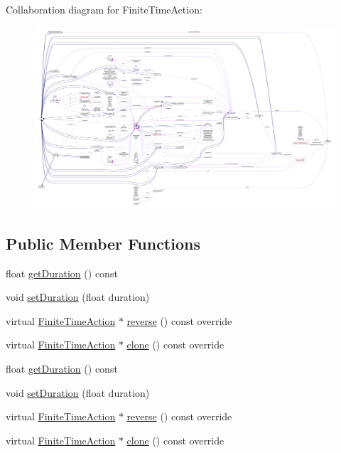 Collaboration diagram for Finite\+Time\+Action\+:
\nopagebreak
\begin{figure}[H]
\begin{center}
\leavevmode
\includegraphics[width=350pt]{classFiniteTimeAction__coll__graph}
\end{center}
\end{figure}
\subsection*{Public Member Functions}
\begin{DoxyCompactItemize}
\item 
float \hyperlink{classFiniteTimeAction_aaa74e388b42ead7cfb7ed9013f6f9aea}{get\+Duration} () const
\item 
void \hyperlink{classFiniteTimeAction_a58c2f166e94dd5b39f8a4b566adf1281}{set\+Duration} (float duration)
\item 
virtual \hyperlink{classFiniteTimeAction}{Finite\+Time\+Action} $\ast$ \hyperlink{classFiniteTimeAction_a886bbdd2dc82167fe6ffae664c22dacc}{reverse} () const override
\item 
virtual \hyperlink{classFiniteTimeAction}{Finite\+Time\+Action} $\ast$ \hyperlink{classFiniteTimeAction_a44813fca4fdf22f367a4657147dd150b}{clone} () const override
\item 
float \hyperlink{classFiniteTimeAction_aaa74e388b42ead7cfb7ed9013f6f9aea}{get\+Duration} () const
\item 
void \hyperlink{classFiniteTimeAction_a58c2f166e94dd5b39f8a4b566adf1281}{set\+Duration} (float duration)
\item 
virtual \hyperlink{classFiniteTimeAction}{Finite\+Time\+Action} $\ast$ \hyperlink{classFiniteTimeAction_a886bbdd2dc82167fe6ffae664c22dacc}{reverse} () const override
\item 
virtual \hyperlink{classFiniteTimeAction}{Finite\+Time\+Action} $\ast$ \hyperlink{classFiniteTimeAction_a44813fca4fdf22f367a4657147dd150b}{clone} () const override
\end{DoxyCompactItemize}
